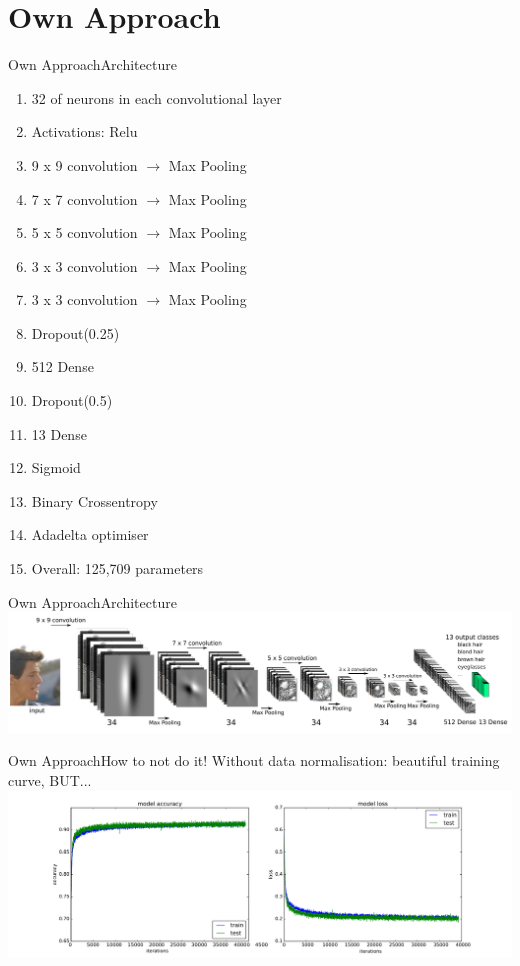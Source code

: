 \documentclass{beamer}
\begin{document}
\section{Own Approach}
\begin{frame}{Own Approach}{Architecture}
	\begin{enumerate}
			\item 	32 of neurons in each convolutional layer
			\item Activations: Relu
			\item 9 x 9 convolution $\rightarrow$ Max Pooling
			\item	7 x 7 convolution $\rightarrow$  Max Pooling
			\item	5 x 5 convolution $\rightarrow$  Max Pooling
			\item	3 x 3 convolution $\rightarrow$  Max Pooling
			\item	3 x 3 convolution $\rightarrow$  Max Pooling
			\item	Dropout(0.25)
			\item	512 Dense
			\item	Dropout(0.5)
			\item	13 Dense
			\item	Sigmoid
			\item	Binary Crossentropy
			\item	Adadelta optimiser
			\item Overall: 125,709 parameters
	\end{enumerate}
\end{frame}

\begin{frame}{Own Approach}{Architecture}
	\hspace*{-1.1cm}
	\includegraphics[width=1.2\textwidth]{figures/architecture} 
\end{frame}

\begin{frame}{Own Approach}{How to not do it!}
Without data normalisation: beautiful training curve, BUT...
\hspace*{-2.4cm}
	\includegraphics[height=0.6\textheight]{figures/lossBad} 
\end{frame}
\end{document}
